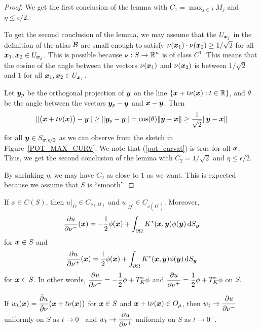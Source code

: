 \begin{proof}
We get the first conclusion of the lemma with
$\displaystyle C_1 = \max_{j \in J} M_j$ and $\eta \leq \epsilon /2$.

To get the second conclusion of the lemma, we may assume that the
$U_{{\bm{x}}_j}$ in the definition of the atlas $\mathcal{B}$ are small enough
to satisfy 
$\nu({\bm{x}}_1)\cdot \nu({\bm{x}}_2) \geq 1/\sqrt{2}$ for all
${\bm{x}}_1,{\bm{x}}_2 \in U_{{\bm{x}}_j}$.  This is possible because
$\displaystyle \nu:S \to \mathbb{R}^n$ is of class $C^1$.  This means that
the cosine of the angle between the vectors
$\nu({\bm{x}}_1)$ and $\nu({\bm{x}}_2)$ is between $1/\sqrt{2}$ and
$1$ for all ${\bm{x}}_1,{\bm{x}}_2 \in U_{{\bm{x}}_j}$.

Let ${\bm{y}}_p$ be the orthogonal projection of ${\bm{y}}$ on the line
$\displaystyle \left\{{\bm{x}} + t\nu({\bm{x}}) : t \in \mathbb{R} \right\}$,
and $\theta$ be the angle between the vectors ${\bm{y}}_p - {\bm{y}}$ and
${\bm{x}}- {\bm{y}}$.  Then
\begin{equation} \label{pot_curvat}
\| \big({\bm{x}} + t\nu({\bm{x}})\big)-{\bm{y}} \|
\geq \|{\bm{y}}_p - {\bm{y}}\| = \cos(\theta)
\|{\bm{y}}-{\bm{x}}\| \geq \frac{1}{\sqrt{2}} \|{\bm{y}}-{\bm{x}}\|
\end{equation}
for all ${\bm{y}} \in S_{{\bm{x}},\epsilon/2}$ as we can observe from
the sketch in Figure~\ref{POT_MAX_CURV}.    We note that
(\ref{pot_curvat}) is true for all ${\bm{x}}$.  Thus, we get the second
conclusion of the lemma with $C_2 = 1/\sqrt{2}$ and $\eta \leq \epsilon/2$.

By shrinking $\eta$, we may have $C_2$ as close to $1$ as we want.
This is expected because we assume that $S$ is ``smooth''.
\end{proof}


\begin{theorem} \label{pot_slp_exist}
If $\phi \in C(S)$, then
$\displaystyle u\big|_{\overline{\Omega}} \in C_{\nu(\Omega)}$ and
$\displaystyle u\big|_{\overline{\Omega^{\prime}}} \in
C_{\nu(\Omega^{\prime})}$.
Moreover,
\[
\frac{\partial{u}}{\partial \nu^-}({\bm{x}}) = -\frac{1}{2} \phi({\bm{x}}) +
\int_{\partial \Omega} K^\ast({\bm{x}},{\bm{y}}) \phi({\bm{y}}) \,\mathrm{d}{S}_{{\bm{y}}}
\]
for ${\bm{x}} \in S$ and
\[
\frac{\partial{u}}{\partial \nu^+}({\bm{x}}) = \frac{1}{2} \phi({\bm{x}}) +
\int_{\partial \Omega} K^\ast({\bm{x}},{\bm{y}}) \phi({\bm{y}}) \,\mathrm{d}{S}_{{\bm{y}}}
\]
for ${\bm{x}} \in S$.  In other words,
$\displaystyle \frac{\partial{u}}{\partial \nu^-} = -\frac{1}{2} \phi + T^\ast_K \phi$
and
$\displaystyle \frac{\partial{u}}{\partial \nu^+} = \frac{1}{2} \phi + T^\ast_K \phi$
on $S$.

If $\displaystyle
w_t({\bm{x}}) = \frac{\tilde{\partial}{u}}{\tilde{\partial}{\nu}}\big({\bm{x}}+t\nu({\bm{x}})\big)$
for ${\bm{x}} \in S$ and ${\bm{x}} + t \nu({\bm{x}}) \in O_\mu$,
then $\displaystyle w_t \rightarrow \frac{\partial{u}}{\partial \nu^-}$ uniformly
on $S$ as $t\rightarrow 0^-$ and
$\displaystyle w_t \rightarrow \frac{\partial{u}}{\partial \nu^+}$ uniformly on
$S$ as $t\rightarrow 0^+$.
\end{theorem}

